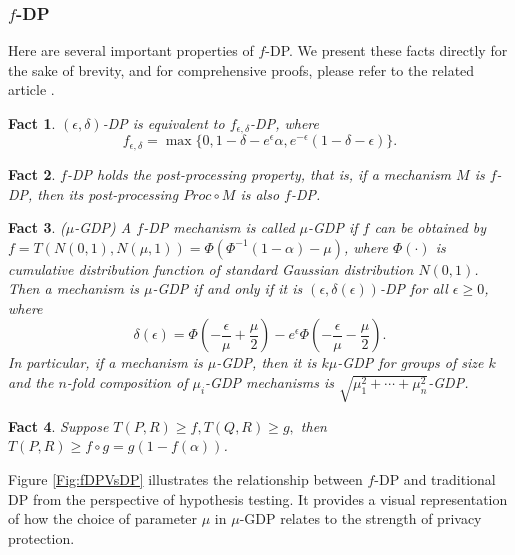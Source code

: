 \documentclass[letterpaper]{article} %
\newtheorem{fact}{Fact}
\begin{document}
\subsubsection{$f$-DP}
Here are several important properties of $f$-DP. We present these facts directly for the sake of brevity, and for comprehensive proofs, please refer to the related article \cite{Dong2022gaussian}.
\begin{fact}\label{factfunc}
$(\epsilon,\delta)$-DP is equivalent to $f_{\epsilon,\delta}$-DP, where
\begin{equation}
f_{\epsilon,\delta} = \max\{0,1-\delta-e^{\epsilon}\alpha,e^{-\epsilon}(1-\delta-\epsilon) \}.
\end{equation}
\end{fact}
\begin{fact}
$f$-DP holds the post-processing property, that is, if a mechanism $M$ is $f$-DP, then its post-processing $Proc \circ M$ is also $f$-DP.
\end{fact}
\begin{fact}\label{muexpand}($\mu$-GDP)
A $f$-DP mechanism is called $\mu$-GDP if $f$ can be obtained by $f=T(N(0,1),N(\mu,1))=\Phi(\Phi^{-1}(1-\alpha)-\mu)$, where $\Phi(\cdot)$ is cumulative distribution function of standard Gaussian distribution $N(0,1)$.
 Then a mechanism is $\mu$-GDP if and only if it is $(\epsilon,\delta(\epsilon))$-DP for all $\epsilon \ge 0$, where $$
\delta(\epsilon)=\Phi(-\frac{\epsilon}{\mu}+\frac{\mu}{2})
-e^{\epsilon}\Phi(-\frac{\epsilon}{\mu}-\frac{\mu}{2}).
$$
 In
particular, if a mechanism is $\mu$-GDP, then it is $k\mu$-GDP for groups of size $k$ and the $n$-fold composition of $\mu_i$-GDP mechanisms is
$\sqrt{\mu_1^2+ \cdots + \mu_n^2}$-GDP.
\end{fact}
\begin{fact}
Suppose $T(P,R) \ge f, T(Q,R) \ge g,$ then $T(P,R) \ge f \circ g = g(1-f(\alpha))$.
\end{fact}
 Figure \ref{Fig:fDPVsDP} 
 \cite{Dong2022gaussian} illustrates the relationship between $f$-DP and traditional DP from the perspective of hypothesis testing. It provides a visual representation of how the choice of parameter $\mu$ in $\mu$-GDP relates to the strength of privacy protection. 
\end{document}
